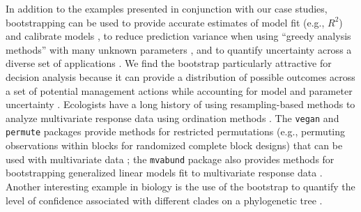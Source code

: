 \documentclass[fleqn,10pt]{wlpeerj} %
\begin{document}
In addition to the examples presented in conjunction with our case studies, bootstrapping can be used to provide accurate estimates of model fit (e.g., \(R^2\)) and calibrate models \citep[Supplementary Appendix D]{harrell_2016}, to reduce prediction variance when using ``greedy analysis methods'' with many unknown parameters \citep[e.g., random forests as a solution to the instability of regression trees;][]{breiman2001random}, and to quantify uncertainty across a diverse set of applications \citep{davison_hinkley_1997, manly2018randomization}. We find the bootstrap particularly attractive for decision analysis because it can provide a distribution of possible outcomes across a set of potential management actions while accounting for model and parameter uncertainty \citep[e.g.,][]{Ellner2003}. Ecologists have a long history of using resampling-based methods to analyze multivariate response data using ordination methods \citep{ter1990update, vendrig2017response, van1999principal, ter2018canoco}. The \texttt{vegan} and \texttt{permute} packages provide methods for restricted permutations (e.g., permuting observations within blocks for randomized complete block designs) that can be used with multivariate data \citep[e.g.,][]{anderson2003permutation, vegan, permute}; the \texttt{mvabund} package also provides methods for bootstrapping generalized linear models fit to multivariate response data \citep{mvabund, wang2012mvabund}. Another interesting example in biology is the use of the bootstrap to quantify the level of confidence associated with different clades on a phylogenetic tree \citep{FelsensteinJoseph1985, efron1996bootstrap}.
\end{document}
